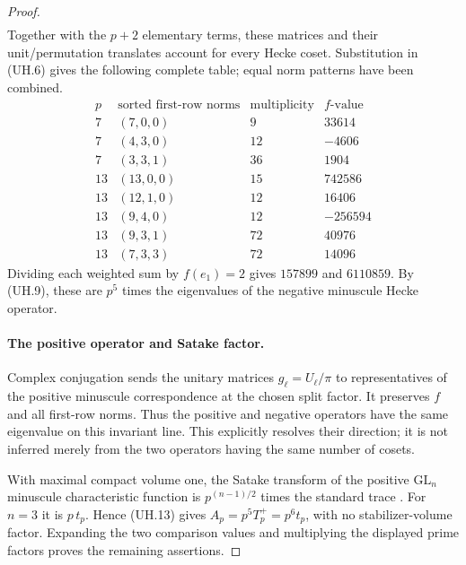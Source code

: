 \documentclass[11pt,a4paper]{article}
\theoremstyle{definition}
\begin{document}
\begin{proof}
\begin{gather*}
 \tag{UH.12}
\end{gather*}
Together with the $p+2$ elementary terms, these matrices and their
unit/permutation translates account for every Hecke coset.  Substitution
in (UH.6) gives the following complete table; equal norm patterns have
been combined.
\[
\begin{array}{c|c|r|r}
 p&\text{sorted first-row norms}&\text{multiplicity}&f\text{-value}\\\hline
 7&(7,0,0)&9&33614\\
 7&(4,3,0)&12&-4606\\
 7&(3,3,1)&36&1904\\\hline
 13&(13,0,0)&15&742586\\
 13&(12,1,0)&12&16406\\
 13&(9,4,0)&12&-256594\\
 13&(9,3,1)&72&40976\\
 13&(7,3,3)&72&14096
\end{array}
 \tag{UH.13}
\]
Dividing each weighted sum by $f(e_1)=2$ gives $157899$ and
$6110859$.  By (UH.9), these are $p^5$ times the eigenvalues of the
negative minuscule Hecke operator.

\paragraph{The positive operator and Satake factor.}
Complex conjugation sends the unitary matrices $g_\ell=U_\ell/\pi$
to representatives of the positive minuscule correspondence at the
chosen split factor.
It preserves $f$ and all first-row norms.
Thus the positive and negative operators have the same eigenvalue
on this invariant line.  This explicitly resolves their direction;
it is not inferred merely from the two operators having the same
number of cosets.

With maximal compact volume one, the Satake transform of the positive
$\mathrm{GL}_n$ minuscule characteristic function is
$p^{(n-1)/2}$ times the standard trace
\cite[\S3, (3.13)--(3.14), author preprint p.~8]{K17GrossSatake1998}.
For $n=3$ it is $p\,t_p$.  Hence (UH.13) gives
$A_p=p^5T_p^+=p^6t_p$, with no stabilizer-volume factor.  Expanding
the two comparison values and multiplying the displayed prime factors
proves the remaining assertions.
\end{proof}
\end{document}
